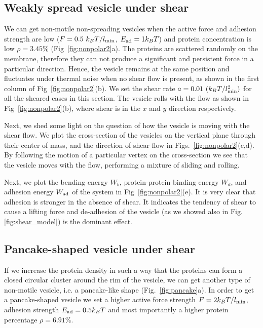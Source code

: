 \documentclass[aps,article,amsmath]{revtex4-2}
\begin{document}
\subsection{Weakly spread vesicle under shear}

We can get non-motile non-spreading vesicles when the active force and adhesion strength are low ($F=0.5~k_BT/l_{\rm min}$, $E_{\rm ad}=1 k_BT$) and protein concentration is low $\rho=3.45\%$ (Fig~\ref{fig:nonpolar2}a). The proteins are scattered randomly on the membrane, therefore they can not produce a significant and persistent force in a particular direction. Hence, the vesicle remains at the same position and fluctuates under thermal noise when no shear flow is present, as shown in the first column of Fig~\ref{fig:nonpolar2}(b). We set the shear rate $a=0.01~(k_BT/l_{\rm min}^2)$ for all the sheared cases in this section. The vesicle rolls with the flow as shown in Fig~\ref{fig:nonpolar2}(b), where shear is in the $x$ and $y$ direction respectively. 

Next, we shed some light on the question of how the vesicle is moving with the shear flow. We plot the cross-section of the vesicles on the vertical plane through their center of mass, and the direction of shear flow in Figs.~\ref{fig:nonpolar2}(c,d). By following the motion of a particular vertex on the cross-section we see that the vesicle moves with the flow, performing a mixture of sliding and rolling.

Next, we plot the bending energy $W_b$, protein-protein binding energy $W_d$, and adhesion energy $W_{\rm ad}$ of the system in Fig~\ref{fig:nonpolar2}(e). It is very clear that adhesion is stronger in the absence of shear. It indicates the tendency of shear to cause a lifting force and de-adhesion of the vesicle (as we showed also in Fig.\ref{fig:shear_model}) is the dominant effect.

\subsection{Pancake-shaped vesicle under shear}
If we increase the protein density in such a way that the proteins can form a closed circular cluster around the rim of the vesicle, we can get another type of non-motile vesicle, i.e. a pancake-like shape (Fig.~\ref{fig:pancake}a). In order to get a pancake-shaped vesicle we set a higher active force strength $F=2k_BT/l_{\rm min}$, adhesion strength $E_{\rm ad}=0.5 k_BT$ and most importantly a higher protein percentage $\rho=6.91\%$.
\end{document}
